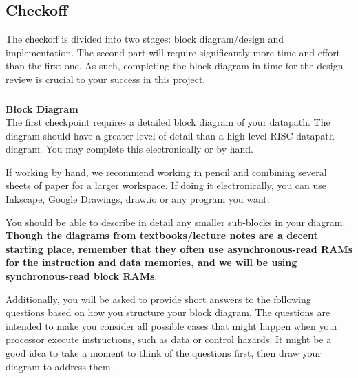 \documentclass[11pt]{article}
\begin{document}
\subsection{Checkoff}
The checkoff is divided into two stages: block diagram/design and implementation.
The second part will require significantly more time and effort than the first one.
As such, completing the block diagram in time for the design review is crucial to your success in this project.

\subsubsection{\blockDiagramTaskName}
\textbf{Block Diagram}\\
The first checkpoint requires a detailed block diagram of your datapath.
The diagram should have a greater level of detail than a high level RISC datapath diagram.
You may complete this electronically or by hand.

If working by hand, we recommend working in pencil and combining several sheets of paper for a larger workspace.
If doing it electronically, you can use Inkscape, Google Drawings, draw.io or any program you want.

You should be able to describe in detail any smaller sub-blocks in your diagram.
\textbf{Though the diagrams from textbooks/lecture notes are a decent starting place, remember that they often use asynchronous-read RAMs for the instruction and data memories, and we will be using synchronous-read block RAMs}.

Additionally, you will be asked to provide short answers to the following questions based on how you structure your block diagram. The questions are intended to make you consider all possible cases that might happen when your processor execute instructions, such as data or control hazards. It might be a good idea to take a moment to think of the questions first, then draw your diagram to address them.
\end{document}
